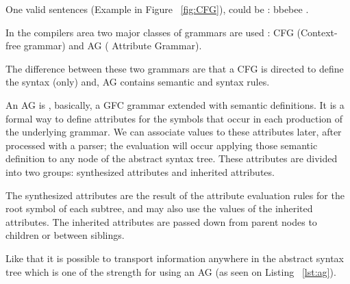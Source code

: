 \documentclass[
  oneside,
  11pt, a4paper,
  footinclude=true,
  headinclude=true,
  cleardoublepage=empty
]{scrbook}
\begin{document}

One valid sentences (Example in Figure ~\ref{fig:CFG}), could be : bbebee .

In the compilers area two major classes of grammars are used : CFG (Context-free grammar) and AG ( Attribute Grammar).

The difference between these two grammars are that a CFG is directed to define the syntax (only) and, AG contains semantic and syntax rules.

An AG is , basically, a GFC grammar extended with semantic definitions. It is a formal way to define attributes for the symbols that occur in each production of the underlying grammar. We can associate values to these attributes later, after processed with a parser; the evaluation will occur applying those semantic definition to any node of the abstract syntax tree.
These attributes are divided into two groups: synthesized attributes and inherited attributes.

The synthesized attributes are the result of the attribute evaluation rules for the root symbol of each subtree, and may also use the values of the inherited attributes. The inherited attributes are passed down from parent nodes to children or between siblings.

Like that it is possible to transport information anywhere in the abstract syntax tree which is one of the strength for using an AG (as seen on Listing ~\ref{lst:ag}).

\end{document}

